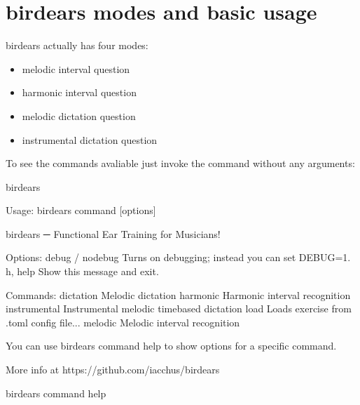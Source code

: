 \documentclass[letterpaper,10pt,english]{sphinxmanual}
\begin{document}
\section{birdears modes and basic usage}
\label{\detokenize{index:birdears-modes-and-basic-usage}}
birdears actually has four modes:
\begin{itemize}
\item {} 
melodic interval question

\item {} 
harmonic interval question

\item {} 
melodic dictation question

\item {} 
instrumental dictation question

\end{itemize}

To see the commands avaliable just invoke the command without any arguments:

\begin{sphinxVerbatim}[commandchars=\\\{\}]
birdears
\end{sphinxVerbatim}

\begin{sphinxVerbatim}[commandchars=\\\{\}]
Usage: birdears  \PYGZlt{}command\PYGZgt{} [options]

  birdears ─ Functional Ear Training for Musicians!

Options:
  \PYGZhy{}\PYGZhy{}debug / \PYGZhy{}\PYGZhy{}no\PYGZhy{}debug  Turns on debugging; instead you can set DEBUG=1.
  \PYGZhy{}h, \PYGZhy{}\PYGZhy{}help            Show this message and exit.

Commands:
  dictation     Melodic dictation
  harmonic      Harmonic interval recognition
  instrumental  Instrumental melodic time\PYGZhy{}based dictation
  load          Loads exercise from .toml config file...
  melodic       Melodic interval recognition

  You can use \PYGZsq{}birdears \PYGZlt{}command\PYGZgt{} \PYGZhy{}\PYGZhy{}help\PYGZsq{} to show options for a specific
  command.

  More info at https://github.com/iacchus/birdears
\end{sphinxVerbatim}

\begin{sphinxVerbatim}[commandchars=\\\{\}]
birdears \PYGZlt{}command\PYGZgt{} \PYGZhy{}\PYGZhy{}help
\end{sphinxVerbatim}
\end{document}
